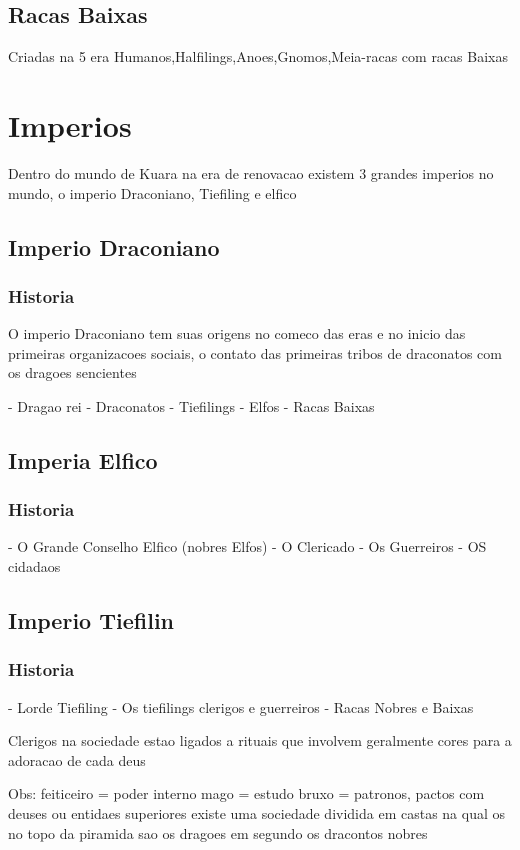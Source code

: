 \documentclass{book}
\begin{document}
\section{Racas Baixas}
Criadas na 5 era 
Humanos,Halfilings,Anoes,Gnomos,Meia-racas com racas Baixas

\chapter{Imperios}
Dentro do mundo de Kuara na era de renovacao existem 3 grandes imperios no mundo, o imperio 
Draconiano, Tiefiling e elfico 

\section{Imperio Draconiano}

\subsection*{Historia}
O imperio Draconiano tem suas origens no comeco das eras e no inicio das primeiras organizacoes 
sociais, o contato das primeiras tribos de draconatos com os dragoes sencientes 

- Dragao rei
- Draconatos
- Tiefilings
- Elfos 
- Racas Baixas

\section{Imperia Elfico}
\subsection*{Historia}
- O Grande Conselho Elfico (nobres Elfos)
- O Clericado 
- Os Guerreiros 
- OS cidadaos

\section{Imperio Tiefilin}
\subsection*{Historia}
- Lorde Tiefiling
- Os tiefilings clerigos e guerreiros  
- Racas Nobres e Baixas 

Clerigos na sociedade estao ligados a rituais que involvem geralmente cores para a adoracao de 
cada deus

Obs: 
	 feiticeiro = poder interno
     mago = estudo
     bruxo = patronos, pactos com deuses ou entidaes superiores
     existe uma sociedade dividida em castas na qual os no topo da piramida sao os dragoes em 
     segundo os dracontos nobres
\end{document}
